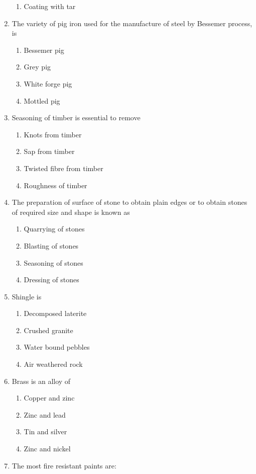 \documentclass[11pt,a4paper]{article}
\begin{document}
\begin{enumerate}
\begin{enumerate}[label=\Alph*.]
\item{Coating with tar}
\end{enumerate}
\item{The variety of pig iron used for the manufacture of steel by Bessemer process, is}
\begin{enumerate}[label=\Alph*.]
\item{Bessemer pig}
\item{Grey pig}
\item{White forge pig}
\item{Mottled pig}
\end{enumerate}
\item{Seasoning of timber is essential to remove}
\begin{enumerate}[label=\Alph*.]
\item{Knots from timber}
\item{Sap from timber}
\item{Twisted fibre from timber}
\item{Roughness of timber}
\end{enumerate}
\item{The preparation of surface of stone to obtain plain edges or to obtain stones of required size and shape is known as}
\begin{enumerate}[label=\Alph*.]
\item{Quarrying of stones}
\item{Blasting of stones}
\item{Seasoning of stones}
\item{Dressing of stones}
\end{enumerate}
\item{Shingle is}
\begin{enumerate}[label=\Alph*.]
\item{Decomposed laterite}
\item{Crushed granite}
\item{Water bound pebbles}
\item{Air weathered rock}
\end{enumerate}
\item{Brass is an alloy of}
\begin{enumerate}[label=\Alph*.]
\item{Copper and zinc}
\item{Zinc and lead}
\item{Tin and silver}
\item{Zinc and nickel}
\end{enumerate}
\item{The most fire resistant paints are:}

\end{enumerate}
\end{document}
